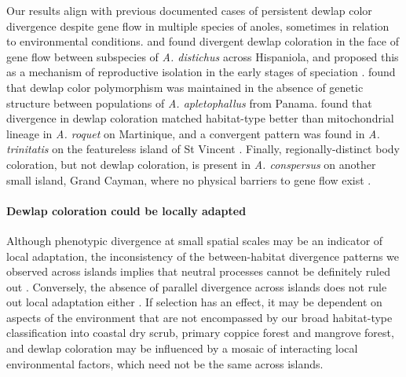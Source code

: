 Our results align with previous documented cases of persistent dewlap color divergence despite gene flow in multiple species of anoles, sometimes in relation to environmental conditions. \citet{Ng2012} and \citet{Ng2016} found divergent dewlap coloration in the face of gene flow between subspecies of \textit{A. distichus} across Hispaniola, and proposed this as a mechanism of reproductive isolation in the early stages of speciation \citep{Ng2011, Lambert2013, Ng2017}. \citet{Stapley2011} found that dewlap color polymorphism was maintained in the absence of genetic structure between populations of \textit{A. apletophallus} from Panama. \citet{Thorpe2002a} found that divergence in dewlap coloration matched habitat-type better than mitochondrial lineage in \textit{A. roquet} on Martinique, and a convergent pattern was found in \textit{A. trinitatis} on the featureless island of St Vincent \citep{Thorpe2002b}. Finally, regionally-distinct body coloration, but not dewlap coloration, is present in \textit{A. conspersus} on another small island, Grand Cayman, where no physical barriers to gene flow exist \citep{Macedonia2001}.\\

\paragraph{Dewlap coloration could be locally adapted} Although phenotypic divergence at small spatial scales may be an indicator of local adaptation, the inconsistency of the between-habitat divergence patterns we observed across islands implies that neutral processes cannot be definitely ruled out \citep{Losos2011}. Conversely, the absence of parallel divergence across islands does not rule out local adaptation either \citep{Losos2011}. If selection has an effect, it may be dependent on aspects of the environment that are not encompassed by our broad habitat-type classification into coastal dry scrub, primary coppice forest and mangrove forest, and dewlap coloration may be influenced by a mosaic of interacting local environmental factors, which need not be the same across islands.\\

